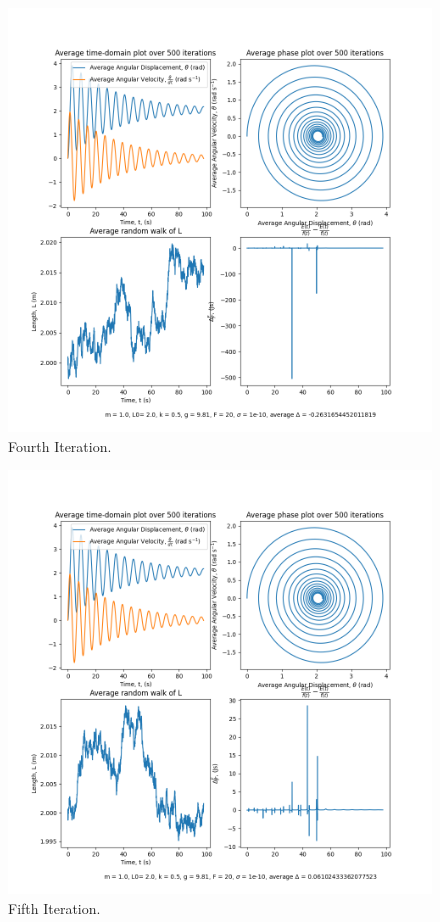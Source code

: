 \documentclass[10pt, twocolumn]{article}
\begin{document}
\begin{figure}[H]
    \centering
    \includegraphics[width = \columnwidth]{Projects/ForcedSimplePendulum/Plots/m = 1.0, L0= 2.0, k = 0.5, g = 9.81, F = 20, sigma = 1e-10, run number 3.png}
    \caption{Fourth Iteration.}
    \label{Fourth Iteration}
\end{figure}

\begin{figure}[H]
    \centering
    \includegraphics[width = \columnwidth]{Projects/ForcedSimplePendulum/Plots/m = 1.0, L0= 2.0, k = 0.5, g = 9.81, F = 20, sigma = 1e-10, run number 4.png}
    \caption{Fifth Iteration.}
    \label{Fifth Iteration}
\end{figure}
\end{document}
